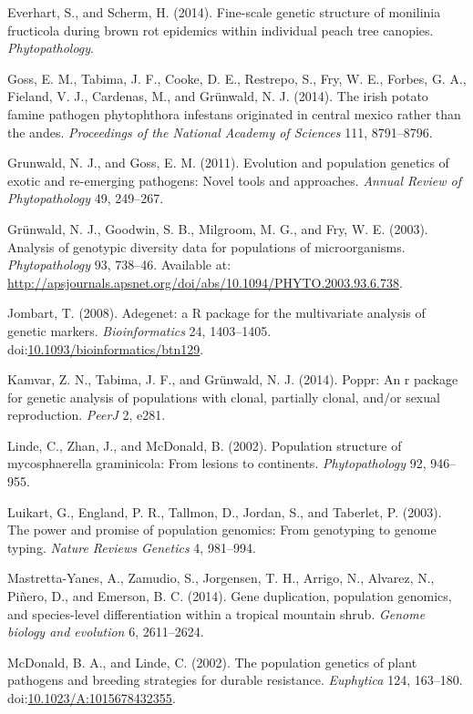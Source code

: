 \documentclass{frontiersSCNS} %
\begin{document}
Everhart, S., and Scherm, H. (2014). Fine-scale genetic structure of
monilinia fructicola during brown rot epidemics within individual peach
tree canopies. \emph{Phytopathology}.

Goss, E. M., Tabima, J. F., Cooke, D. E., Restrepo, S., Fry, W. E.,
Forbes, G. A., Fieland, V. J., Cardenas, M., and Gr{ü}nwald, N. J.
(2014). The irish potato famine pathogen phytophthora infestans
originated in central mexico rather than the andes. \emph{Proceedings of
the National Academy of Sciences} 111, 8791--8796.

Grunwald, N. J., and Goss, E. M. (2011). Evolution and population
genetics of exotic and re-emerging pathogens: Novel tools and
approaches. \emph{Annual Review of Phytopathology} 49, 249--267.

Grünwald, N. J., Goodwin, S. B., Milgroom, M. G., and Fry, W. E. (2003).
Analysis of genotypic diversity data for populations of microorganisms.
\emph{Phytopathology} 93, 738--46. Available at:
\url{http://apsjournals.apsnet.org/doi/abs/10.1094/PHYTO.2003.93.6.738}.

Jombart, T. (2008). Adegenet: a R package for the multivariate analysis
of genetic markers. \emph{Bioinformatics} 24, 1403--1405.
doi:\href{http://dx.doi.org/10.1093/bioinformatics/btn129}{10.1093/bioinformatics/btn129}.

Kamvar, Z. N., Tabima, J. F., and Gr{ü}nwald, N. J. (2014). Poppr: An r
package for genetic analysis of populations with clonal, partially
clonal, and/or sexual reproduction. \emph{PeerJ} 2, e281.

Linde, C., Zhan, J., and McDonald, B. (2002). Population structure of
mycosphaerella graminicola: From lesions to continents.
\emph{Phytopathology} 92, 946--955.

Luikart, G., England, P. R., Tallmon, D., Jordan, S., and Taberlet, P.
(2003). The power and promise of population genomics: From genotyping to
genome typing. \emph{Nature Reviews Genetics} 4, 981--994.

Mastretta-Yanes, A., Zamudio, S., Jorgensen, T. H., Arrigo, N., Alvarez,
N., Pi{ñ}ero, D., and Emerson, B. C. (2014). Gene duplication,
population genomics, and species-level differentiation within a tropical
mountain shrub. \emph{Genome biology and evolution} 6, 2611--2624.

McDonald, B. A., and Linde, C. (2002). The population genetics of plant
pathogens and breeding strategies for durable resistance.
\emph{Euphytica} 124, 163--180.
doi:\href{http://dx.doi.org/10.1023/A:1015678432355}{10.1023/A:1015678432355}.
\end{document}
